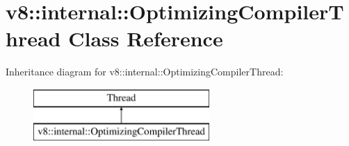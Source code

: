 \hypertarget{classv8_1_1internal_1_1_optimizing_compiler_thread}{}\section{v8\+:\+:internal\+:\+:Optimizing\+Compiler\+Thread Class Reference}
\label{classv8_1_1internal_1_1_optimizing_compiler_thread}
Inheritance diagram for v8\+:\+:internal\+:\+:Optimizing\+Compiler\+Thread\+:\begin{figure}[H]
\begin{center}
\leavevmode
\includegraphics[height=2.000000cm]{classv8_1_1internal_1_1_optimizing_compiler_thread}
\end{center}
\end{figure}
